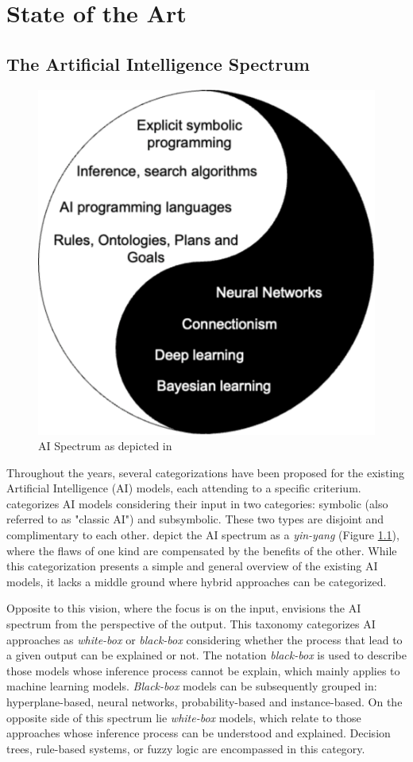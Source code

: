 \chapter{State of the Art}
\label{chap:soa}

\section{The Artificial Intelligence Spectrum} \label{sec:the_ai_spectrum}

\begin{figure}
    \centering
    \includegraphics[width=.5\linewidth]{3_stateoftheart/figures/Lieberman_taxonomy.eps}
    \caption{AI Spectrum as depicted in \cite{lieberman_symbolic_nodate}}
    \label{fig:lieberman_tax}
\end{figure}

Throughout the years, several categorizations have been proposed for the existing Artificial Intelligence (AI) models, each attending to a specific criterium. \cite{lieberman_symbolic_nodate} categorizes AI models considering their input in two categories: symbolic (also referred to as "classic AI") and subsymbolic. These two types are disjoint and complimentary to each other. \cite{lieberman_symbolic_nodate} depict the AI spectrum as a \textit{yin-yang} (Figure \ref{fig:lieberman_tax}), where the flaws of one kind are compensated by the benefits of the other. While this categorization presents a simple and general overview of the existing AI models, it lacks a middle ground where hybrid approaches can be categorized. 

Opposite to this vision, where the focus is on the input, \cite{loyola-gonzalez_black-box_2019} envisions the AI spectrum from the perspective of the output. This taxonomy categorizes AI approaches as \textit{white-box} or \textit{black-box} considering whether the process that lead to a given output can be explained or not. The notation \textit{black-box} is used to describe those models whose inference process cannot be explain, which mainly applies to machine learning models.  \textit{Black-box} models can be subsequently grouped in: hyperplane-based, neural networks, probability-based and instance-based. On the opposite side of this spectrum lie \textit{white-box} models, which relate to those approaches whose inference process can be understood and explained. Decision trees, rule-based systems, or fuzzy logic are encompassed in this category.



